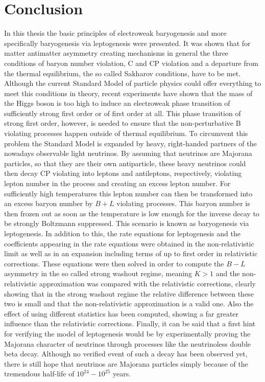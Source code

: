 \chapter{Conclusion}
In this thesis the basic principles of electroweak baryogenesis and more specifically baryogenesis via leptogenesis were presented. It was shown that for matter antimatter asymmetry creating mechanisms in general the three conditions of baryon number violation, C and CP violation and a departure from the thermal equilibrium, the so called Sakharov conditions, have to be met. \newline \indent
Although the current Standard Model of particle physics could offer everything to meet this conditions in theory, recent experiments have shown that the mass of the Higgs boson is too high to induce an  electroweak phase transition of sufficiently strong first order or of first order at all. This phase transition of strong first order, however, is needed to ensure that the non-perturbative B violating processes happen outside of thermal equilibrium. \newline \indent
To circumvent this problem the Standard Model is expanded by heavy, right-handed partners of the nowadays observable light neutrinos. By assuming that neutrinos are Majorana particles, so that they are their own antiparticle, these heavy neutrinos could then decay CP violating into leptons and antileptons, respectively, violating lepton number in the process and creating an excess lepton number. For sufficiently high temperatures this lepton number can then be transformed into an excess baryon number by $B+L$ violating processes. This baryon number is then frozen out as soon as the temperature is low enough for the inverse decay to be strongly Boltzmann suppressed. This scenario is known as baryogenesis via leptogenesis. \newline \indent
In addition to this, the rate equations for leptogenesis and the coefficients appearing in the rate equations were obtained in the non-relativistic limit as well as in an expansion including terms of up to first order in relativistic corrections. These equations were then solved in order to compute the $B-L$ asymmetry in the so called strong washout regime, meaning $K>1$ and the non-relativistic approximation was compared with the relativistic corrections, clearly showing that in the strong washout regime the relative difference between these two is small and that the non-relativistic approximation is a valid one. Also the effect of using different statistics has been computed, showing a far greater influence than the relativistic corrections.  \newline \indent
Finally, it can be said that a first hint for verifying the model of leptogenesis would be by experimentally proving the Majorana character of neutrinos through processes like the neutrinoless double beta decay. Although no verified event of such a decay has been observed yet, there is still hope that neutrinos are Majorana particles simply because of the tremendous half-life of $10^{24}-10^{25}$ years\cite{Arnold:2016ezh}.

